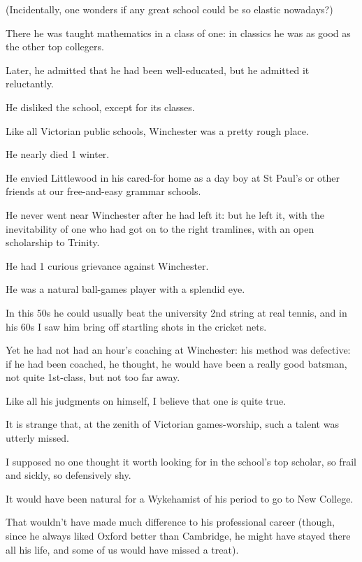 \documentclass{article}
\numberwithin{equation}{section}
\begin{document}
(Incidentally, one wonders if any great school could be so elastic nowadays?)

There he was taught mathematics in a class of one: in classics he was as good as the other top collegers.

Later, he admitted that he had been well-educated, but he admitted it reluctantly.

He disliked the school, except for its classes.

Like all Victorian public schools, Winchester was a pretty rough place.

He nearly died 1 winter.

He envied Littlewood in his cared-for home as a day boy at St Paul's or other friends at our free-and-easy grammar schools.

He never went near Winchester after he had left it: but he left it, with the inevitability of one who had got on to the right tramlines, with an open scholarship to Trinity.

%
He had 1 curious grievance against Winchester.

He was a natural ball-games player with a splendid eye.

In this 50s he could usually beat the university 2nd string at real tennis, and in his 60s I saw him bring off startling shots in the cricket nets.

Yet he had not had an hour's coaching at Winchester: his method was defective: if he had been coached, he thought, he would have been a really good batsman, not quite 1st-class, but not too far away.

Like all his judgments on himself, I believe that one is quite true.

It is strange that, at the zenith of Victorian games-worship, such a talent was utterly missed.

I supposed no one thought it worth looking for in the school's top scholar, so frail and sickly, so defensively shy.

%
It would have been natural for a Wykehamist of his period to go to New College.

That wouldn't have made much difference to his professional career (though, since he always liked Oxford better than Cambridge, he might have stayed there all his life, and some of us would have missed a treat).
\end{document}
